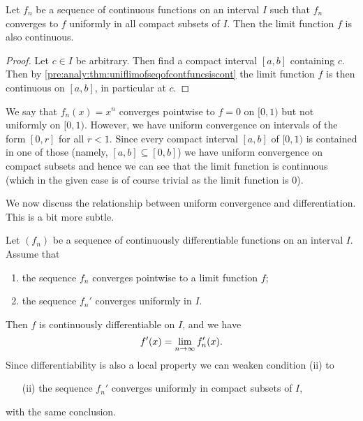 \documentclass[10pt, a4paper]{article}
\begin{document}
\begin{theorem}\label{pre:analy:thm:limofseqcontunifconviscont}
    Let $f_n$ be a sequence of continuous functions on an interval $I$ such that $f_n$ converges to $f$ uniformly in all compact subsets of $I$.
    Then the limit function $f$ is also continuous.

    \begin{proof}
        Let $c \in I$ be arbitrary.
        Then find a compact interval $[a, b]$ containing $c$.
        Then by \autoref{pre:analy:thm:uniflimofseqofcontfuncsiscont} the limit function $f$ is then continuous on $[a, b]$,
        in particular at $c$.
    \end{proof}
\end{theorem}

\begin{example}
    We say that $f_n(x) = x ^ n$ converges pointwise to $f = 0$ on $[0, 1)$ but not uniformly on $[0, 1)$.
    However,
    we have uniform convergence on intervals of the form $[0, r]$ for all $r < 1$.
    Since every compact interval $[a, b]$ of $[0, 1)$ is contained in one of those
    (namely,
    $[a, b] \subseteq [0, b]$)
    we have uniform convergence on compact subsets and hence we can see that the limit function is continuous
    (which in the given case is of course trivial as the limit function is $0$).
\end{example}

We now discuss the relationship between uniform convergence and differentiation.
This is a bit more subtle.

\begin{theorem}\label{pre:analy:thm:contdifffuncsconvas}
    Let $(f_n)$ be a sequence of continuously differentiable functions on an interval $I$.
    Assume that
    \begin{enumerate}[label = (\roman*)]
        \item the sequence $f_n$ converges pointwise to a limit function $f$;
        \item the sequence $f_n'$ converges uniformly in $I$.
    \end{enumerate}
    Then $f$ is continuously differentiable on $I$,
    and we have
    \[
    f'(x) = \lim_{n \rightarrow \infty} f_n'(x).
    \]
    Since differentiability is also a local property we can weaken condition (ii) to
    \begin{enumerate}[label = (\roman*)]
        \item[(ii)] the sequence $f_n'$ converges uniformly in compact subsets of $I$,
    \end{enumerate}
    with the same conclusion.
\end{theorem}
\end{document}
